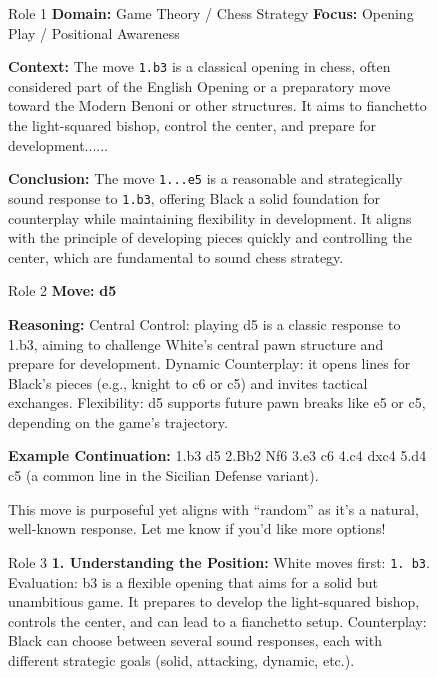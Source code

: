 \begin{figure}[t]
\centering

\begin{minipage}[t]{0.32\linewidth}
\begin{modarespbox}{Role 1}
\textbf{Domain:} Game Theory / Chess Strategy \quad \textbf{Focus:} Opening Play / Positional Awareness

\textbf{Context:} The move \texttt{1.b3} is a classical opening in chess, often considered part of the English Opening or a preparatory move toward the Modern Benoni or other structures. It aims to fianchetto the light-squared bishop, control the center, and prepare for development......

\textbf{Conclusion:} The move \texttt{1...e5} is a reasonable and strategically sound response to \texttt{1.b3}, offering Black a solid foundation for counterplay while maintaining flexibility in development. It aligns with the principle of developing pieces quickly and controlling the center, which are fundamental to sound chess strategy.

\end{modarespbox}
\end{minipage}\hfill%
\begin{minipage}[t]{0.32\linewidth}
\begin{modarespbox}{Role 2}
\textbf{Move:} \textbf{d5}

\textbf{Reasoning:} Central Control: playing d5 is a classic response to 1.b3, aiming to challenge White's central pawn structure and prepare for development. Dynamic Counterplay: it opens lines for Black's pieces (e.g., knight to c6 or c5) and invites tactical exchanges. Flexibility: d5 supports future pawn breaks like e5 or c5, depending on the game's trajectory.

\textbf{Example Continuation:} 1.b3 d5 2.Bb2 Nf6 3.e3 c6 4.c4 dxc4 5.d4 c5 (a common line in the Sicilian Defense variant).

This move is purposeful yet aligns with ``random'' as it's a natural, well-known response. Let me know if you'd like more options!

\end{modarespbox}
\end{minipage}\hfill%
\begin{minipage}[t]{0.32\linewidth}
\begin{modarespbox}{Role 3}
\textbf{1. Understanding the Position:} White moves first: \texttt{1. b3}. Evaluation: b3 is a flexible opening that aims for a solid but unambitious game. It prepares to develop the light-squared bishop, controls the center, and can lead to a fianchetto setup. Counterplay: Black can choose between several sound responses, each with different strategic goals (solid, attacking, dynamic, etc.).


\end{modarespbox}
\end{minipage}
\end{figure}

